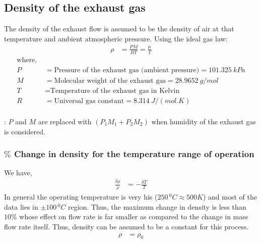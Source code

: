 \subsection{Density of the exhaust gas}

The density of the exhaust flow is assumed to be the density of air at that
temperature and ambient atmospheric pressure. Using the ideal gas law:
\begin{align}
    \rho &= \frac{PM}{R T} = \frac{\mu}{T}
\end{align}
\begin{align*}
    \text{where, } &\\
    P &= \text{Pressure of the exhaust gas (ambient pressure)} = 101.325 \: kPa\\
    M &= \text{Molecular weight of the exhaust gas} = 28.9652 \: g/mol\\
    T &= \text{Temperature of the exhaust gas in Kelvin}\\
    R &= \text{Universal gas constant} = 8.314 \: J/(mol.K)\\
\end{align*}

: $P$ and $M$ are replaced with $(P_1 M_1 + P_2 M_2)$ when humidity of the exhaust gas is considered.

\subsubsection{$\%$ Change in density for the temperature range of operation}
We have,
\begin{align*}
    \frac{\delta \rho}{\rho} &= -\frac{\delta T}{T}
\end{align*}
In general the operating temperature is very his ($250 \,^0 C \approx 500 K$) and most of the data lies in $\pm 100 \, ^0 C$ region. Thus, the maximum change in density is less than $10\%$ whose effect on flow rate is far smaller as compared to the change in mass flow rate itself. Thus, density can be assumed to be a constant for this process.
\begin{align}
    \rho &= \rho_0
\end{align}


